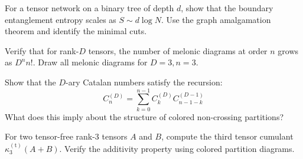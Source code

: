 \begin{exercise}
   For a tensor network on a binary tree of depth $d$, show that the boundary entanglement entropy scales as $S \sim d \log N$.
   Use the graph amalgamation theorem and identify the minimal cuts.
\end{exercise}
\begin{exercise}
   Verify that for rank-$D$ tensors, the number of melonic diagrams at order $n$ grows as $D^n n!$.
   Draw all melonic diagrams for $D=3, n=3$.
\end{exercise}
\begin{exercise}
   Show that the $D$-ary Catalan numbers satisfy the recursion:
   \[
      C_n^{(D)} = \sum_{k=0}^{n-1} C_k^{(D)} C_{n-1-k}^{(D-1)}
   \]
   What does this imply about the structure of colored non-crossing partitions?
\end{exercise}
\begin{exercise}
   For two tensor-free rank-3 tensors $A$ and $B$, compute the third tensor cumulant $\kappa_3^{(\mathrm{t})}(A+B)$.
   Verify the additivity property using colored partition diagrams.
\end{exercise}
